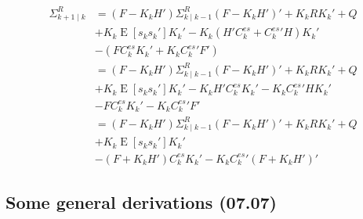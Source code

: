 \documentclass[oneside,12pt]{article}
\begin{document}
%
\begin{equation}\label{eq:errCov_Real_subs04}
    \begin{split}
        \Sigma^R_{k+1 \mid k} &= (F - K_k H')\Sigma^R_{k \mid k-1}(F - K_k H')' + K_k R K_k' + Q\\
        & + K_k \operatorname{E}\left[ s_k s_k'\right] K_k' - K_k \left( 
        H'C^{es}_k + C^{es}_k' H \right) K_k'\\
        & - (FC^{es}_k  K_k' + K_k C^{es}_k' F')\\
        &= (F - K_k H')\Sigma^R_{k \mid k-1}(F - K_k H')' + K_k R K_k' + Q\\
        & + K_k \operatorname{E}\left[ s_k s_k'\right] K_k' -  
        K_k H' C^{es}_k K_k' - K_k C^{es}_k' H K_k' \\
        & - FC^{es}_k  K_k' - K_k C^{es}_k' F'\\
        &= (F - K_k H')\Sigma^R_{k \mid k-1}(F - K_k H')' + K_k R K_k' + Q\\
        & + K_k \operatorname{E}\left[ s_k s_k'\right] K_k'  \\
        & - (F + K_k H') C^{es}_k  K_k' - K_k C^{es}_k' (F + K_k H')' 
    \end{split}
\end{equation}  
%
%
\subsection{Some general derivations (07.07)}\label{sec:subGeneralDerivs}
%
\end{document}

